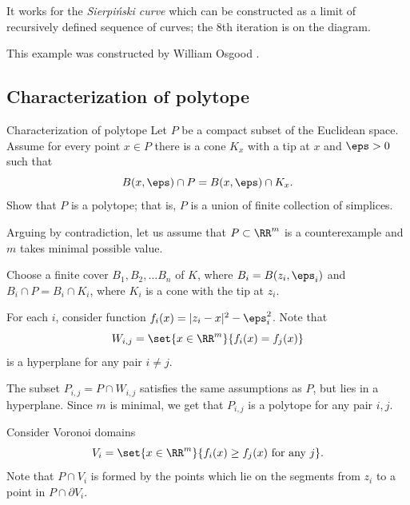 It works for the \emph{Sierpi\'nski curve} 
which can be constructed as a limit of 
recursively defined sequence of curves;
the 8th iteration is on the diagram.\qeds 

This example was constructed 
by William Osgood \cite[see][]{osgood}.









\subsection*{Characterization of polytope}

\begin{pr}{}{Characterization of polytope}
\label{conic neighborhoods}
Let $P$ be a compact subset of the Euclidean space.
Assume for every point $x\in P$
there is a cone $K_x$ with a tip at $x$ and $\eps>0$
such that 
$$B(x,\eps)\cap P
=
B(x,\eps)\cap K_x.$$
Show that $P$ is a polytope; 
that is, $P$ is a union of finite collection of simplices.
\end{pr}
Arguing by contradiction, let us assume that $P\subset \RR^m$
is a counterexample and $m$ takes minimal possible value.

Choose a finite cover $B_1,B_2,\dots B_n$ of $K$,
where $B_i=B(z_i,\eps_i)$ 
and $B_i\cap P=B_i\cap K_i$, 
where $K_i$ is a cone with the tip at $z_i$.

For each $i$, consider function $f_i(x)=|z_i-x|^2-\eps_i^2$.
Note that
\[W_{i,j}=\set{x\in\RR^m}{f_i(x)=f_j(x)}\]
is a hyperplane for any pair $i\ne j$.

The subset $P_{i,j}=P\cap W_{i,j}$ satisfies the same assumptions as $P$, but lies in a hyperplane.
Since $m$ is minimal, we get that $P_{i,j}$ is a polytope for any pair $i,j$.

Consider Voronoi domains 
\[V_{i}=\set{x\in\RR^m}{f_i(x)\ge f_j(x) \ \text{for any}\ j}.\]
Note that $P\cap V_i$ is formed by the points which lie on the segments from $z_i$ to a point in  $P\cap \partial V_i$.

